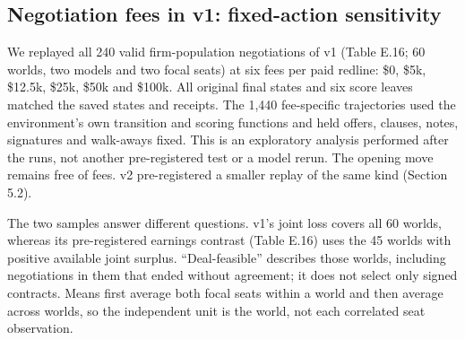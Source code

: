 \subsection{Negotiation fees in v1: fixed-action sensitivity}\label{negotiation-fees-in-v1-fixed-action-sensitivity}

We replayed all 240 valid firm-population negotiations of v1 (Table E.16; 60 worlds, two models and two focal seats)
at six fees per paid redline: \$0, \$5k, \$12.5k, \$25k, \$50k and \$100k. All original final states and six score leaves
matched the saved states and receipts. The 1,440 fee-specific trajectories used the environment's own transition and
scoring functions and held offers, clauses, notes, signatures and walk-aways fixed. This is an exploratory analysis
performed after the runs, not another pre-registered test or a model rerun. The opening move remains free of fees. v2
pre-registered a smaller replay of the same kind (Section 5.2).

The two samples answer different questions. v1's joint loss covers all 60 worlds, whereas its pre-registered earnings
contrast (Table E.16) uses the 45 worlds with positive available joint surplus. ``Deal-feasible'' describes those worlds,
including negotiations in them that ended without agreement; it does not select only signed contracts. Means first
average both focal seats within a world and then average across worlds, so the independent unit is the world, not each
correlated seat observation.

